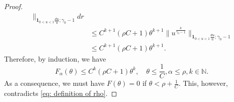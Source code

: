 \documentclass[12pt, a4paper]{amsart}
\theoremstyle{definition}
\numberwithin{equation}{section}
\begin{document}
\begin{proof}
\begin{equation}
\begin{split}
	\|_{\mathbf 1_{0<u<1}\frac{du}{u}; \gamma_0 - 1} dr
	\\&\leq C^{k+1} (\rho C + 1) \theta^{k+1} \|u^{\frac{k}{\gamma_0 - 1} } \|_{\mathbf 1_{0<u<1}\frac{du}{u}; \gamma_0 - 1}
\\&\leq C^{k+1} (\rho C+1) \theta^{k+1} .
\end{split}\end{equation}
	Therefore, by induction, we have
\begin{equation}
	F_\alpha (\theta)
	\leq C^k(\rho C + 1) \theta^k,
	\quad \theta \leq \frac{1}{C}, \alpha \leq \rho, k \in \mathbb N.
\end{equation}
	As a consequence, we must have $F(\theta) = 0$ if $\theta < \rho + \frac{1}{C}$.
	This, however, contradicts \eqref{eq: definition of rho}.
\end{proof}
\end{document}
